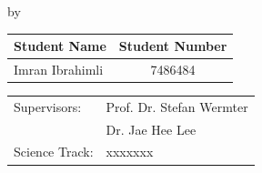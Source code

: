 \begin{titlepage}
\newpage

\setlength{\headheight}{14pt}
 \begin{center}

{\makeatletter
\largetitlestyle\fontsize{45}{45}\selectfont\@title
\makeatother}

{\makeatletter
\ifdefvoid{\@subtitle}{}{\bigskip\fontsize{20}{20}\selectfont\@subtitle}
\makeatother}

\bigskip
\bigskip

by

\bigskip
\bigskip

{\makeatletter
\largetitlestyle\fontsize{25}{25}\selectfont\@author
\makeatother}

\bigskip
\bigskip

\setlength\extrarowheight{2pt}
\begin{tabular}{lc}
    Student Name & Student Number \\\midrule
    Imran Ibrahimli & 7486484 \\
\end{tabular}

\vfill

\begin{tabular}{ll}
    Supervisors: & Prof. Dr. Stefan Wermter \\
                 & Dr. Jae Hee Lee \\
    Science Track: & xxxxxxx
\end{tabular}

\bigskip
\bigskip



\end{center}

	
\end{titlepage}